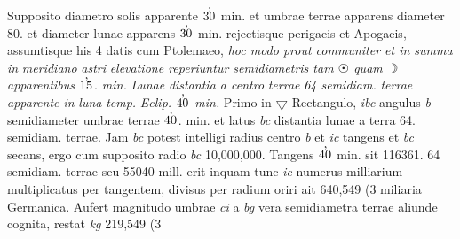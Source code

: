 \pstart {} Supposito diametro solis\protect{} apparente $30\hspace{-6pt}\raisebox{9pt}{,}\protect\hspace{4pt}$ min. et umbrae terrae\protect{}  apparens diameter 80. et diameter lunae\protect{} apparens $30\hspace{-6pt}\raisebox{9pt}{,}\protect\hspace{4pt}$ min. rejectisque perigaeis\protect{} et Apogaeis\protect{}, assumtisque his 4 datis  cum Ptolemaeo\protect{}, \textit{hoc modo prout communiter  et in summa in }\textit{meridiano}\protect{}\textit{ }\textit{astri}\protect{}\textit{ elevatione reperiuntur semidiametris tam $\astrosun$ quam $\rightmoon$ apparentibus $15\hspace{-6pt}\raisebox{9pt}{,}\protect\hspace{4pt}$. min. }\textit{Lunae}\protect{}\textit{  distantia a centro }\textit{terrae}\protect{}\textit{ 64  semidiam. }\textit{terrae}\protect{}\textit{ apparente in }\textit{luna}\protect{}\textit{ temp. }\textit{Eclip.}\protect{}\textit{ $40\hspace{-6pt}\raisebox{9pt}{,}\protect\hspace{4pt}$ min.} Primo in $\bigtriangledown$ Rectangulo, \textit{ibc} angulus \textit{b} semidiameter umbrae terrae\protect{} $40\hspace{-6pt}\raisebox{9pt}{,}\protect\hspace{4pt}$. min. et latus \textit{bc} distantia lunae\protect{} a terra\protect{} 64. semidiam. terrae\protect{}. Jam \textit{bc} potest intelligi radius centro \textit{b} et \textit{ic}  tangens et \textit{bc} secans, ergo cum supposito radio \textit{bc} 10,000,000. Tangens $40\hspace{-6pt}\raisebox{9pt}{,}\protect\hspace{4pt}$ min. sit 116361.   64 semidiam. terrae\protect{} seu 55040 mill. erit inquam  tunc \textit{ic} numerus milliarium multiplicatus per tangentem, divisus per radium  oriri  ait 640,549 (3 miliaria Germanica.  Aufert magnitudo umbrae \textit{ci} a \textit{bg} vera  semidiametra terrae\protect{} aliunde cognita,  restat \textit{kg} 219,549 (3 